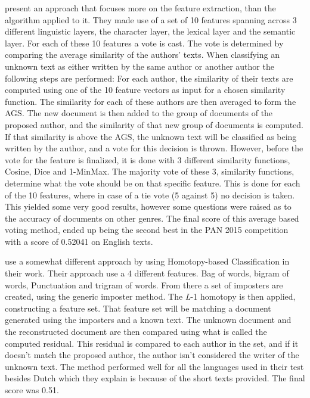 \cite{castro2015Paper} present an approach that focuses more on the feature
extraction, than the algorithm applied to it. They made use of a set of 10
features spanning across 3 different linguistic layers, the character layer,
the lexical layer and the semantic layer. For each of these 10 features a vote
is cast. The vote is determined by comparing the average similarity of the
authors' texts. When classifying an unknown text as either written by the same
author or another author the following steps are performed: For each author,
the similarity of their texts are computed using one of the 10 feature vectors
as input for a chosen similarity function. The similarity for each of these
authors are then averaged to form the \gls{AGS}. The new document is then added
to the group of documents of the proposed author, and the similarity of that new
group of documents is computed. If that similarity is above the \gls{AGS}, the
unknown text will be classified as being written by the author, and a vote for
this decision is thrown. However, before the vote for the feature is finalized,
it is done with 3 different similarity functions, Cosine, Dice and 1-MinMax. The
majority vote of these 3, similarity functions, determine what the vote should
be on that specific feature. This is done for each of the 10 features, where in
case of a tie vote (5 against 5) no decision is taken. This yielded some very
good results, however some questions were raised as to the accuracy of documents
on other genres. The final score of this average based voting method, ended up
being the second best in the PAN 2015 competition with a score of 0.52041 on
English texts.

\cite{gutierrez2015} use a somewhat different approach by using Homotopy-based
Classification in their work. Their approach use a 4 different features. Bag
of words, bigram of words, Punctuation and trigram of words. From there a set
of imposters are created, using the generic imposter method. The \textit{L}-1
homotopy is then applied, constructing a feature set. That feature set will be
matching a document generated using the imposters and a known text. The unknown
document and the reconstructed document are then compared using what is called
the computed residual. This residual is compared to each author in the set,
and if it doesn't match the proposed author, the author isn't considered the
writer of the unknown text. The method performed well for all the languages used
in their test besides Dutch which they explain is because of the short texts
provided. The final score was 0.51.

